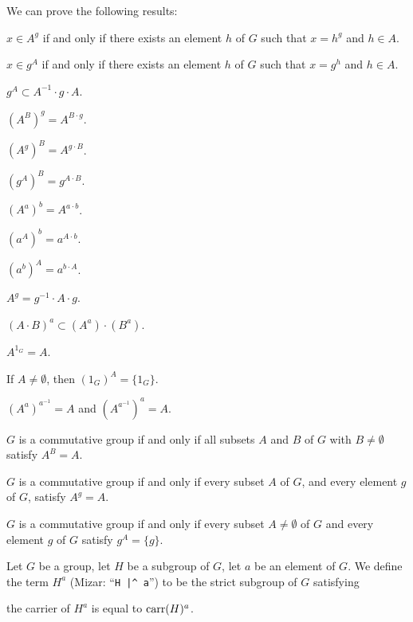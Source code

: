\documentclass{article}
\begin{document}
We can prove the following results:
\begin{thm}
\item\label{group3:41} $x\in A^{g}$ if and only if there exists an
  element $h$ of $G$ such that $x=h^{g}$ and $h\in A$.
\item\label{group3:42} $x\in g^{A}$ if and only if there exists an
  element $h$ of $G$ such that $x=g^{h}$ and $h\in A$. 
\item\label{group3:43} $g^{A}\subset A^{-1}\cdot g\cdot A$.
\item\label{group3:44} $(A^{B})^{g}=A^{B\cdot g}$.
\item\label{group3:45} $(A^{g})^{B}=A^{g\cdot B}$.
\item\label{group3:46} $(g^{A})^{B}=g^{A\cdot B}$.
\item\label{group3:47} $(A^{a})^{b}=A^{a\cdot b}$.
\item\label{group3:48} $(a^{A})^{b}=a^{A\cdot b}$.
\item\label{group3:49} $(a^{b})^{A}=a^{b\cdot A}$.
\item\label{group3:50} $A^{g}=g^{-1}\cdot A\cdot g$.
\item\label{group3:51} $(A\cdot B)^{a}\subset (A^{a})\cdot(B^{a})$.
\item\label{group3:52} $A^{1_{G}}=A$.
\item\label{group3:53} If $A\neq\emptyset$, then $(1_{G})^{A}=\{1_{G}\}$.
\item\label{group3:54} $(A^{a})^{a^{-1}}=A$ and $(A^{a^{-1}})^{a}=A$.
\item\label{group3:55} $G$ is a commutative group if and only if all
  subsets $A$ and $B$ of $G$ with $B\neq\emptyset$ satisfy $A^{B}=A$.
\item\label{group3:56} $G$ is a commutative group if and only if every
  subset $A$ of $G$, and every element $g$ of $G$, satisfy $A^{g}=A$.
\item\label{group3:57} $G$ is a commutative group if and only if every
  subset $A\neq\emptyset$ of $G$ and every element $g$ of $G$ satisfy $g^{A}=\{g\}$.
\end{thm}

\begin{definition}
Let $G$ be a group, let $H$ be a subgroup of $G$, let $a$ be an element
of $G$. We define the term $H^{a}$ (Mizar: ``\verb#H |^ a#'') to be the strict subgroup of $G$ satisfying
\begin{defn}
\item the carrier of $H^{a}$ is equal to $\operatorname{carr}(H)^{a}$.
\end{defn}
\end{definition}
\end{document}
